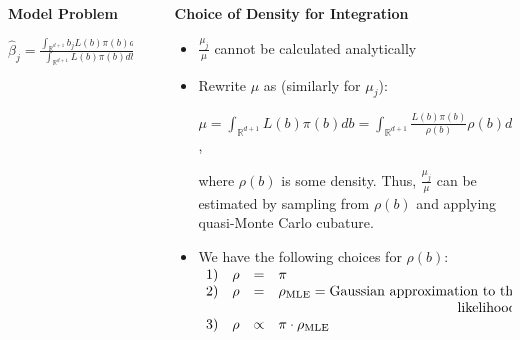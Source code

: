 \documentclass[final,mathserif]{beamer}
\newcommand{\blue}[1]{{\color{myblue}#1}}
\renewcommand{\blue}{\textcolor{blue!80!black}}
\begin{document}
\begin{frame}[fragile]
\begin{columns}[t]
\begin{column}{.31\linewidth}
\begin{block}{\Large \textbf{\blue {Model Problem}}}
\begin{itemize}
\vspace{.05in}

 $\hat{\beta}_j=\frac{\int_{\mathbb{R}^{d+1}}b_jL(b)\pi(b)db}{\int_{\mathbb{R}^{d+1}}L(b)\pi(b)db} =: \frac{\mu_j}{\mu}, ~for\ j=0, 1, 2,\ldots, d$


\end{itemize}
\end{block}

\end{column}


\begin{column}{.015\linewidth} \end{column} %

\begin{column}{.31\linewidth}

\begin{block}{\Large \textbf{\blue {Choice of Density for Integration}}}
\vspace{.1in}
\begin{itemize}
\item $\frac{\mu_j}{\mu}$ cannot be calculated analytically

\item Rewrite $\mu$ as (similarly for $\mu_j$): 

\vspace{.1in}

$\mu=\int_{\mathbb{R}^{d+1}}L(b)\pi(b)db=\int_{\mathbb{R}^{d+1}}\frac{L(b)\pi(b)}{\rho(b)}\rho(b)db$,

\vspace{.1in}

where $\rho(b)$ is some density.  Thus, $\frac{\mu_j}{\mu}$ can be estimated by sampling from $\rho(b)$ and applying quasi-Monte Carlo cubature.
\item  We have the following choices for $\rho(b)$:
$\begin{array}{rrcl}
1) & \rho & = & \pi \\
2) & \rho & = & \rho_{\text{MLE}} = \text{Gaussian approximation to the}\\ 
&&&\hspace{4.5cm} \text{likelihood}\\
3) & \rho & \propto & \pi \cdot \rho_{\text{MLE}}
\end{array}$

\end{itemize}
\end{block}


\end{column}
\end{columns}
\end{frame}
\end{document}

